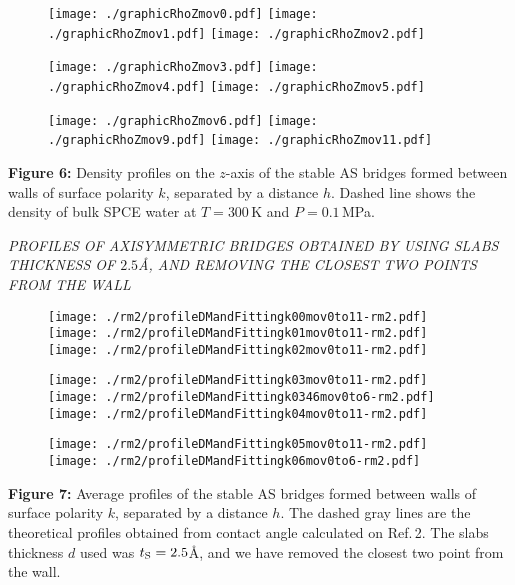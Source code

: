 \documentclass[a0,portrait,16pt]{a0poster}
\begin{document}
{{\begin{figure}
	\centerline{
		\texttt{[image: ./graphicRhoZmov0.pdf]}
		\texttt{[image: ./graphicRhoZmov1.pdf]}
		\texttt{[image: ./graphicRhoZmov2.pdf]}
	}
	\centerline{
		\texttt{[image: ./graphicRhoZmov3.pdf]}
		\texttt{[image: ./graphicRhoZmov4.pdf]}
		\texttt{[image: ./graphicRhoZmov5.pdf]}
	}
	\centerline{
		\texttt{[image: ./graphicRhoZmov6.pdf]}
		\texttt{[image: ./graphicRhoZmov9.pdf]}
		\texttt{[image: ./graphicRhoZmov11.pdf]}
	}	
\end{figure}		
\small{\textbf{Figure 6: }Density profiles on the $z$-axis of the stable AS bridges formed between walls of surface polarity $k$, separated by a distance $h$. 
Dashed line shows the density of bulk SPCE water at $T=300$\,K and $P=0.1$\,MPa. }

\vspace{1cm}
\begin{center}                                        
	\textsf{\large{\textit{\textcolor[RGB]{77,134,66}{PROFILES OF AXISYMMETRIC BRIDGES OBTAINED BY USING SLABS THICKNESS OF $\bm{2.5}$\AA, AND REMOVING THE CLOSEST TWO  POINTS FROM THE WALL}}}}
\end{center}



\begin{figure}
	\centerline{\texttt{[image: ./rm2/profileDMandFittingk00mov0to11-rm2.pdf]}
		\texttt{[image: ./rm2/profileDMandFittingk01mov0to11-rm2.pdf]}
		\texttt{[image: ./rm2/profileDMandFittingk02mov0to11-rm2.pdf]}
	}
	\centerline{\texttt{[image: ./rm2/profileDMandFittingk03mov0to11-rm2.pdf]}
		\texttt{[image: ./rm2/profileDMandFittingk0346mov0to6-rm2.pdf]}
		\texttt{[image: ./rm2/profileDMandFittingk04mov0to11-rm2.pdf]}
	}
	\centerline{\texttt{[image: ./rm2/profileDMandFittingk05mov0to11-rm2.pdf]}
		\texttt{[image: ./rm2/profileDMandFittingk06mov0to6-rm2.pdf]}
	}	
\end{figure}
\small{\textbf{Figure 7: } Average profiles of the stable AS bridges formed between walls of surface polarity $k$, separated by a distance $h$. The dashed gray lines are the theoretical profiles obtained from contact angle calculated on Ref.\,2. The slabs thickness $d$ used was $t_{\rm S}=2.5$\AA, and we have removed the closest two point from the wall.}


}}
\end{document}
